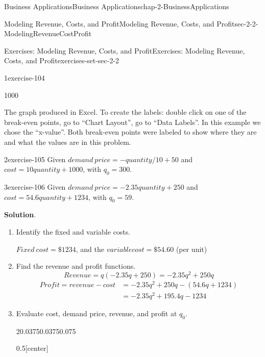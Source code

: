 \documentclass[oneside,10pt,]{book}
\numberwithin{equation}{section}
\newcommand{\amp}{&}
\begin{document}
\begin{chapterptx}{Business Applications}{}{Business Applications}{}{}{chap-2-BusinessApplications}
\begin{sectionptx}{Modeling Revenue, Costs, and Profit}{}{Modeling Revenue, Costs, and Profit}{}{}{sec-2-2-ModelingRevenueCostProfit}
\begin{exercises-subsection-numberless}{Exercises: Modeling Revenue, Costs, and Profit}{}{Exercises: Modeling Revenue, Costs, and Profit}{}{}{exercises-set-sec-2-2}
\begin{exercisegroup}
\begin{divisionexerciseeg}{1}{}{}{exercise-104}
\begin{enumerate}[label=(\alph*)]
\begin{sidebyside}{1}{0}{0}{0}
\end{sidebyside}%
\par
\hypertarget{p-697}{}%
The graph produced in Excel. To create the labels: double click on one of the break-even points, go to ``Chart Layout'', go to ``Data Labels''. In this example we chose the ``x-value''.  Both break-even points were labeled to show where they are and what the values are in this problem.%
\end{enumerate}
\end{divisionexerciseeg}%
\begin{divisionexerciseeg}{2}{}{}{exercise-105}%
\hypertarget{p-698}{}%
Given \(demand\ price=- quantity/10+50\) and \(cost=10 quantity+1000\), with \(q_0=300\).%
\end{divisionexerciseeg}%
\begin{divisionexerciseeg}{3}{}{}{exercise-106}%
\hypertarget{p-699}{}%
Given \(demand\ price=-2.35 quantity+250\) and \(cost=54.6 quantity+1234\), with \(q_0=59\).%
\par\smallskip%
\noindent\textbf{Solution}.\hypertarget{solution-51}{}\quad%
\leavevmode%
\begin{enumerate}[label=(\alph*)]
\item\hypertarget{li-201}{}\hypertarget{p-700}{}%
Identify the fixed and variable costs.%
\par
\hypertarget{p-701}{}%
\(Fixed\ cost = \$1234\), and the \(variable cost =\$54.60\) (per unit)%
\item\hypertarget{li-202}{}\hypertarget{p-702}{}%
Find the revenue and profit functions.%
%
\begin{equation*}
Revenue=q(-2.35 q+250)= -2.35 q^2+250 q
\end{equation*}
%
\begin{align*}
Profit=revenue-cost \amp=-2.35 q^2+250 q-(54.6q+1234)\\
\amp=-2.35 q^2+195.4 q-1234
\end{align*}
\item\hypertarget{li-203}{}\hypertarget{p-703}{}%
Evaluate cost, demand price, revenue, and profit at \(q_0\).%
\begin{sidebyside}{2}{0.0375}{0.0375}{0.075}%
\begin{sbspanel}{0.5}[center]%

\end{sbspanel}
\end{sidebyside}
\end{enumerate}
\end{divisionexerciseeg}
\end{exercisegroup}
\end{exercises-subsection-numberless}
\end{sectionptx}
\end{chapterptx}
\end{document}
